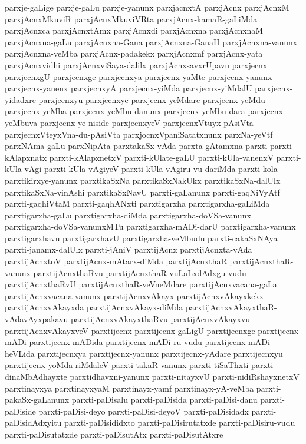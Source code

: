 {parxje-gaLige
parxje-gaLu
parxje-yanunx
parxjacnxtA
parxjAcnx
parxjAcnxM
parxjAcnxMkuviR
parxjAcnxMkuviVRta
parxjAcnx-kamaR-gaLiMda
parxjAcnxca
parxjAcnxtAmx
parxjAcnxdi
parxjAcnxna
parxjAcnxnaM
parxjAcnxna-gaLu
parxjAcnxna-Gana
parxjAcnxna-GanaH
parxjAcnxna-vanunx
parxjAcnxna-veMba
parxjAcnx-padakekx
parxjAcnxmf
parxjAcnx-yata
parxjAcnxvidhi
parxjAcnxviSaya-dalilx
parxjAcnxsavxrUpavu
parxjecnx
parxjecnxgU
parxjecnxge
parxjecnxya
parxjecnx-yaMte
parxjecnx-yanunx
parxjecnx-yanenx
parxjecnxyA
parxjecnx-yiMda
parxjecnx-yiMdalU
parxjecnx-yidadxre
parxjecnxyu
parxjecnxye
parxjecnx-yeMdare
parxjecnx-yeMdu
parxjecnx-yeMba
parxjecnx-yeMbu-danunx
parxjecnx-yeMbu-dara
parxjecnx-yeMbuva
parxjecnx-ye-niside
parxjecnxyeV
parxjecnxVtuyx-pAsiVta
parxjecnxVteyxVna-du-pAsiVta
parxjocnxVpaniSatatxnunx
parxNa-yeVtf
parxNAma-gaLu
parxNipAta
parxtakaSx-vAda
parxta-gAtamxna
parxti
parxti-kAlapxnatx
parxti-kAlapxnetxV
parxti-kUlate-gaLU
parxti-kUla-vanenxV
parxti-kUla-vAgi
parxti-kUla-vAgiyeV
parxti-kUla-vAgiru-vu-dariMda
parxti-kola
parxtikirxye-yanunx
parxtikaSxNa
parxtikaSxNakUkx
parxtikaSxNa-dalUlx
parxtikaSxNa-vinAshi
parxtikaSxNavU
parxti-gaLanunx
parxti-gaqNiVyAtf
parxti-gaqhiVtaM
parxti-gaqhANxti
parxtigarxha
parxtigarxha-gaLiMda
parxtigarxha-gaLu
parxtigarxha-diMda
parxtigarxha-doVSa-vanunx
parxtigarxha-doVSa-vanunxMTu
parxtigarxha-mADi-darU
parxtigarxha-vanunx
parxtigarxhavu
parxtigarxhavU
parxtigarxha-veMbudu
parxti-cakaSxNAya
parxti-janamx-dalUlx
parxti-jAniV
parxtijAcnx
parxtijAcnxta-vAda
parxtijAcnxtoV
parxtijAcnx-mAtarx-diMda
parxtijAcnxthaR
parxtijAcnxthaR-vanunx
parxtijAcnxthaRvu
parxtijAcnxthaR-vuLaLxdAdxgu-vudu
parxtijAcnxthaRvU
parxtijAcnxthaR-veVneMdare
parxtijAcnxvacana-gaLa
parxtijAcnxvacana-vanunx
parxtijAcnxvAkayx
parxtijAcnxvAkayxkekx
parxtijAcnxvAkayxda
parxtijAcnxvAkayx-diMda
parxtijAcnxvAkayxthaR-vAdavAyxpakavu
parxtijAcnxvAkayxthaRvu
parxtijAcnxvAkayxvu
parxtijAcnxvAkayxveV
parxtijecnx
parxtijecnx-gaLigU
parxtijecnxge
parxtijecnx-mADi
parxtijecnx-mADida
parxtijecnx-mADi-ru-vudu
parxtijecnx-mADi-heVLida
parxtijecnxya
parxtijecnx-yanunx
parxtijecnx-yAdare
parxtijecnxyu
parxtijecnx-yoMda-riMdaleV
parxti-takaR-vanunx
parxti-tiSaThxti
parxti-dinaMbAdhayxte
parxtidhavxni-yanunx
parxti-nitayxvU
parxti-nidiRshayxnetxV
parxtinayxya
parxtinayxyaM
parxtinayx-yamf
parxtinayx-yA-veMba
parxti-pakaSx-gaLanunx
parxti-paDisalu
parxti-paDisida
parxti-paDisi-danu
parxti-paDiside
parxti-paDisi-deyo
parxti-paDisi-deyoV
parxti-paDisidadx
parxti-paDisidAdxyitu
parxti-paDisididxto
parxti-paDisirutatxde
parxti-paDisiru-vudu
parxti-paDisutatxde
parxti-paDisutAtx
parxti-paDisutAtxre
}
